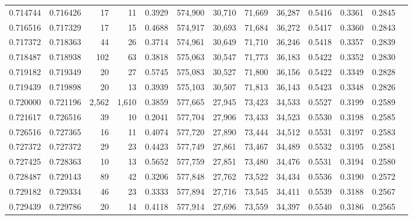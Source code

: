 \begin{tabular}{rrrrrrrrrrrrr}
0.714744 & 0.716426 &     17 &    11 &                                     0.3929 & 574,900 &  30,710 &  71,669 &  36,287 & 0.5416 & 0.3361 & 0.2845 \\
0.716516 & 0.717329 &     17 &    15 &                                     0.4688 & 574,917 &  30,693 &  71,684 &  36,272 & 0.5417 & 0.3360 & 0.2843 \\
0.717372 & 0.718363 &     44 &    26 &                                     0.3714 & 574,961 &  30,649 &  71,710 &  36,246 & 0.5418 & 0.3357 & 0.2839 \\
0.718487 & 0.718938 &    102 &    63 &                                     0.3818 & 575,063 &  30,547 &  71,773 &  36,183 & 0.5422 & 0.3352 & 0.2830 \\
0.719182 & 0.719349 &     20 &    27 &                                     0.5745 & 575,083 &  30,527 &  71,800 &  36,156 & 0.5422 & 0.3349 & 0.2828 \\
0.719439 & 0.719898 &     20 &    13 &                                     0.3939 & 575,103 &  30,507 &  71,813 &  36,143 & 0.5423 & 0.3348 & 0.2826 \\
0.720000 & 0.721196 &  2,562 & 1,610 &                                     0.3859 & 577,665 &  27,945 &  73,423 &  34,533 & 0.5527 & 0.3199 & 0.2589 \\
0.721617 & 0.726516 &     39 &    10 &                                     0.2041 & 577,704 &  27,906 &  73,433 &  34,523 & 0.5530 & 0.3198 & 0.2585 \\
0.726516 & 0.727365 &     16 &    11 &                                     0.4074 & 577,720 &  27,890 &  73,444 &  34,512 & 0.5531 & 0.3197 & 0.2583 \\
0.727372 & 0.727372 &     29 &    23 &                                     0.4423 & 577,749 &  27,861 &  73,467 &  34,489 & 0.5532 & 0.3195 & 0.2581 \\
0.727425 & 0.728363 &     10 &    13 &                                     0.5652 & 577,759 &  27,851 &  73,480 &  34,476 & 0.5531 & 0.3194 & 0.2580 \\
0.728487 & 0.729143 &     89 &    42 &                                     0.3206 & 577,848 &  27,762 &  73,522 &  34,434 & 0.5536 & 0.3190 & 0.2572 \\
0.729182 & 0.729334 &     46 &    23 &                                     0.3333 & 577,894 &  27,716 &  73,545 &  34,411 & 0.5539 & 0.3188 & 0.2567 \\
0.729439 & 0.729786 &     20 &    14 &                                     0.4118 & 577,914 &  27,696 &  73,559 &  34,397 & 0.5540 & 0.3186 & 0.2565 \\

\end{tabular}
